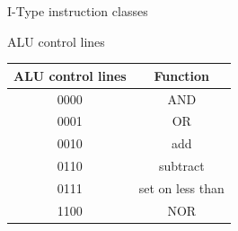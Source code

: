 \documentclass[landscape,fontscale=1,margin=0.2cm,paperwidth=60truecm, paperheight=34truecm,debug]{baposter}
\begin{document}
\begin{poster}
\begin{posterbox}[column=2,textborder=rounded]{I-Type instruction classes}
\begin{center}
\end{center}
\end{posterbox}
\begin{posterbox}[column=3,textborder=rounded]{ALU control lines}
\begin{center}
\begin{tabular}{|c|c|}
\hline
ALU control lines & Function\\\hline
0000 & AND\\\hline
0001 & OR\\\hline
0010 & add\\\hline
0110 & subtract\\\hline
0111 & set on less than\\\hline
1100 & NOR\\\hline
\end{tabular}
\end{center}
\end{posterbox}
\end{poster}
\end{document}
